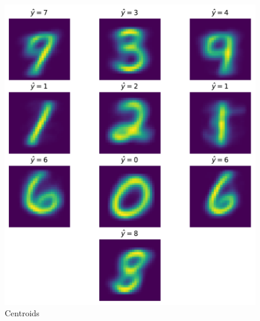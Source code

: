 \documentclass[12pt,a4paper]{scrartcl}
\begin{document}
	\begin{figure}[H]
		\centering
		\includegraphics[width=0.5\linewidth]{figs/ex4_3_centroids}
		\caption{Centroids}
		\label{fig:ex4_3_centroids}
	\end{figure}
	

	
\end{document}
